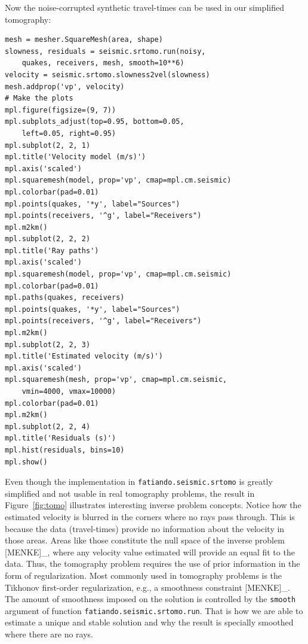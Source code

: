 Now the noise-corrupted synthetic travel-times can be used in our
simplified tomography:

\begin{verbatim}
mesh = mesher.SquareMesh(area, shape)
slowness, residuals = seismic.srtomo.run(noisy,
    quakes, receivers, mesh, smooth=10**6)
velocity = seismic.srtomo.slowness2vel(slowness)
mesh.addprop('vp', velocity)
# Make the plots
mpl.figure(figsize=(9, 7))
mpl.subplots_adjust(top=0.95, bottom=0.05,
    left=0.05, right=0.95)
mpl.subplot(2, 2, 1)
mpl.title('Velocity model (m/s)')
mpl.axis('scaled')
mpl.squaremesh(model, prop='vp', cmap=mpl.cm.seismic)
mpl.colorbar(pad=0.01)
mpl.points(quakes, '*y', label="Sources")
mpl.points(receivers, '^g', label="Receivers")
mpl.m2km()
mpl.subplot(2, 2, 2)
mpl.title('Ray paths')
mpl.axis('scaled')
mpl.squaremesh(model, prop='vp', cmap=mpl.cm.seismic)
mpl.colorbar(pad=0.01)
mpl.paths(quakes, receivers)
mpl.points(quakes, '*y', label="Sources")
mpl.points(receivers, '^g', label="Receivers")
mpl.m2km()
mpl.subplot(2, 2, 3)
mpl.title('Estimated velocity (m/s)')
mpl.axis('scaled')
mpl.squaremesh(mesh, prop='vp', cmap=mpl.cm.seismic,
    vmin=4000, vmax=10000)
mpl.colorbar(pad=0.01)
mpl.m2km()
mpl.subplot(2, 2, 4)
mpl.title('Residuals (s)')
mpl.hist(residuals, bins=10)
mpl.show()
\end{verbatim}

Even though the implementation in \texttt{fatiando.seismic.srtomo} is greatly
simplified and not usable in real tomography problems, the result in
Figure~\ref{fig:tomo} illustrates interesting inverse problem concepts.  Notice
how the estimated velocity is blurred in the corners where no rays pass
through. This is because the data (travel-times) provide no information about
the velocity in those areas. Areas like those constitute the null space of the
inverse problem {[}MENKE{]}\_, where any velocity value estimated will provide
an equal fit to the data.  Thus, the tomography problem requires the use of
prior information in the form of regularization. Most commonly used in
tomography problems is the Tikhonov first-order regularization, e.g., a
smoothness constraint {[}MENKE{]}\_. The amount of smoothness imposed on the
solution is controlled by the \texttt{smooth} argument of function
\texttt{fatiando.seismic.srtomo.run}. That is how we are able to estimate a
unique and stable solution and why the result is specially smoothed where there
are no rays.



